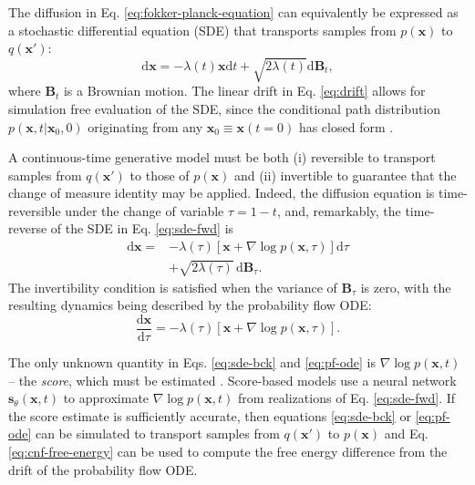 \documentclass[%
 aip,
 amsmath,amssymb,
 reprint,%
]{revtex4-1}
\begin{document}
The diffusion in Eq. \ref{eq:fokker-planck-equation} can equivalently be expressed as a stochastic differential equation (SDE) that transports samples from $p(\mathbf{x})$ to $q(\mathbf{x}')$:
\begin{equation}
    \label{eq:sde-fwd}
    \mathrm{d}\mathbf{x} = -\lambda(t) \mathbf{x} \mathrm{d}t + \sqrt{2 \lambda(t)}\mathrm{d}\mathbf{B}_t,
\end{equation}
where $\mathbf{B}_t$ is a Brownian motion. The linear drift in Eq. \ref{eq:drift} allows for simulation free evaluation of the SDE, since the conditional path distribution $p(\mathbf{x},t | \mathbf{x}_0,0)$ originating from any $\mathbf{x}_0 \equiv \mathbf{x}(t=0)$ has closed form \cite{score-based-generative,nonequilibrium-learning}.

A continuous-time generative model must be both (i) reversible to transport samples from $q(\mathbf{x}')$ to those of $p(\mathbf{x})$ and (ii) invertible to guarantee that the change of measure identity may be applied. Indeed, the diffusion equation is time-reversible under the change of variable $\tau = 1 - t$, and, remarkably, the time-reverse of the SDE in Eq. \ref{eq:sde-fwd} is
\begin{equation}
    \label{eq:sde-bck}
    \begin{aligned}
        \mathrm{d}\mathbf{x} =& -\lambda(\tau) \left[ \mathbf{x} + \nabla \log p(\mathbf{x},\tau) \right] \mathrm{d}\tau \\
        &+ \sqrt{2 \lambda(\tau)} \, \mathrm{d}\mathbf{B}_\tau.
    \end{aligned}
\end{equation}
The invertibility condition is satisfied when the variance of $\mathbf{B}_\tau$ is zero, with the resulting dynamics being described by the probability flow ODE:
\begin{equation}
    \label{eq:pf-ode}
    \frac{\mathrm{d}\mathbf{x}}{\mathrm{d}\tau} = -\lambda(\tau) \left[ \mathbf{x} + \nabla \log p(\mathbf{x},\tau) \right].
\end{equation}

The only unknown quantity in Eqs. \ref{eq:sde-bck} and \ref{eq:pf-ode} is $\nabla \log p(\mathbf{x},t)$ -- the {\it score}, which must be estimated \cite{hyvarinen-score}. Score-based models use a neural network $\mathbf{s}_\theta(\mathbf{x},t)$ to approximate $\nabla \log p(\mathbf{x},t)$ from realizations of Eq. \ref{eq:sde-fwd}. If the score estimate is sufficiently accurate, then equations \ref{eq:sde-bck} or \ref{eq:pf-ode} can be simulated to transport samples from $q(\mathbf{x}')$ to $p(\mathbf{x})$ and Eq. \ref{eq:cnf-free-energy} can be used to compute the free energy difference from the drift of the probability flow ODE.
\end{document}

